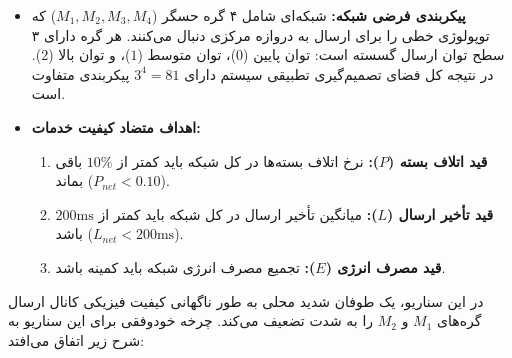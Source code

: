 \documentclass[oneside,openany,phd]{TMU-Thesis}
\begin{document}
\begin{itemize}

\item \textbf{پیکربندی فرضی شبکه:} شبکه‌ای شامل ۴ گره حسگر ($M_1, M_2, M_3, M_4$) که توپولوژی خطی را برای ارسال به دروازه مرکزی دنبال می‌کنند. هر گره دارای ۳ سطح توان ارسال گسسته است: توان پایین ($0$)، توان متوسط ($1$)، و توان بالا ($2$). در نتیجه کل فضای تصمیم‌گیری تطبیقی سیستم دارای $3^4 = 81$ پیکربندی متفاوت است.

\item \textbf{اهداف متضاد کیفیت خدمات:}

\begin{enumerate}

\item \textbf{قید اتلاف بسته ($P$):} نرخ اتلاف بسته‌ها در کل شبکه باید کمتر از $10\%$ باقی بماند ($P_{net} < 0.10$).

\item \textbf{قید تأخیر ارسال ($L$):} میانگین تأخیر ارسال در کل شبکه باید کمتر از $200\text{ms}$ باشد ($L_{net} < 200\text{ms}$).

\item \textbf{قید مصرف انرژی ($E$):} تجمیع مصرف انرژی شبکه باید کمینه باشد.

\end{enumerate}

\end{itemize}



در این سناریو، یک طوفان شدید محلی به طور ناگهانی کیفیت فیزیکی کانال ارسال گره‌های $M_1$ و $M_2$ را به شدت تضعیف می‌کند. چرخه خودوفقی برای این سناریو به شرح زیر اتفاق می‌افتد:
\end{document}
